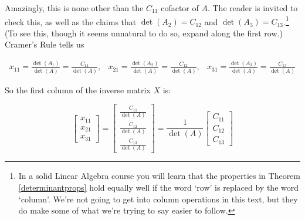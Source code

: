 \documentclass{ximera}
\begin{document}
Amazingly, this is none other than the  $C_{11}$ cofactor of $A$.  The reader is invited to check this, as well as the claims that  $\det\left(A_2\right) = C_{12}$ and $\det\left(A_3\right) = C_{13}$.\footnote{In a solid Linear Algebra course you will learn that the properties in Theorem \ref{determinantprops} hold equally well if the word `row' is replaced by the word `column'.  We're not going to get into column operations in this text, but they do make some of what we're trying to say easier to follow.} (To see this, though it seems unnatural to do so, expand along the first row.) Cramer's Rule tells us

\[\begin{array}{ccc}

x_{11} = \frac{\det\left(A_{1}\right)}{\det(A)} = \frac{C_{11}}{\det(A)}, 
&
x_{21} = \frac{\det\left(A_2\right)}{\det(A)}  = \frac{C_{12}}{\det(A)}, 
&
 x_{31} = \frac{\det\left(A_3\right)}{\det(A)} = \frac{C_{13}}{\det(A)}


\end{array} \]

So the first column of the inverse matrix $X$ is:

\[  \left[ \begin{array}{r} x_{11} \\ x_{21} \\ x_{31} \end{array} \right] = \left[ \begin{array}{r} \frac{C_{11}}{\det(A)} \\    \frac{C_{12}}{\det(A)} \\    \frac{C_{13}}{\det(A)} \end{array} \right] = \frac{1}{\det(A)} \left[ \begin{array}{r} C_{11} \\ C_{12} \\ C_{13} \end{array} \right]  \]
\end{document}

